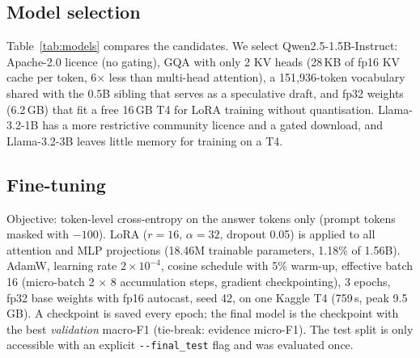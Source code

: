 \documentclass[conference]{IEEEtran}
\begin{document}
\subsection{Model selection}
Table~\ref{tab:models} compares the candidates. We select Qwen2.5-1.5B-Instruct: Apache-2.0 licence (no gating), GQA with only 2 KV heads (28\,KB of fp16 KV cache per token, 6$\times$ less than multi-head attention), a 151{,}936-token vocabulary shared with the 0.5B sibling that serves as a speculative draft, and fp32 weights (6.2\,GB) that fit a free 16\,GB T4 for LoRA training without quantisation. Llama-3.2-1B has a more restrictive community licence and a gated download, and Llama-3.2-3B leaves little memory for training on a T4.

\begin{table}[t]\centering\caption{Open-weight decoder candidates.}\label{tab:models}\setlength{\tabcolsep}{3pt}
\end{table}

\subsection{Fine-tuning}
Objective: token-level cross-entropy on the answer tokens only (prompt tokens masked with $-100$). LoRA ($r{=}16$, $\alpha{=}32$, dropout 0.05) is applied to all attention and MLP projections (18.46M trainable parameters, 1.18\% of 1.56B). AdamW, learning rate $2\times10^{-4}$, cosine schedule with 5\% warm-up, effective batch 16 (micro-batch 2 $\times$ 8 accumulation steps, gradient checkpointing), 3 epochs, fp32 base weights with fp16 autocast, seed 42, on one Kaggle T4 (759\,s, peak 9.5\,GB). A checkpoint is saved every epoch; the final model is the checkpoint with the best \emph{validation} macro-F1 (tie-break: evidence micro-F1). The test split is only accessible with an explicit \verb!--final_test! flag and was evaluated once.
\end{document}
